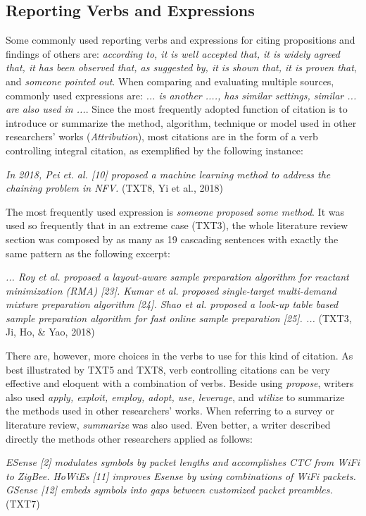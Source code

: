 
\subsection{Reporting Verbs and Expressions}
Some commonly used reporting verbs and expressions for citing propositions and findings of others are: \textit{according to, it is well accepted that, it is widely agreed that, it has been observed that, as suggested by, it is shown that, it is proven that}, and \textit{someone pointed out}. When comparing and evaluating multiple sources, commonly used expressions are: \textit{... is another ...., has similar settings, similar ... are also used in ...}. Since the most frequently adopted function of citation is to introduce or summarize the method, algorithm, technique or model used in other researchers’ works (\textit{Attribution}), most citations are in the form of a verb controlling integral citation, as exemplified by the following instance:

\textit{In 2018, Pei et. al. [10] proposed a machine learning method to address the chaining problem in NFV.} (TXT8, Yi et al., 2018)

The most frequently used expression is \textit{someone proposed some method}. It was used so frequently that in an extreme case (TXT3), the whole literature review section was composed by as many as 19 cascading sentences with exactly the same pattern as the following excerpt:

\textit{... Roy et al. proposed a layout-aware sample preparation algorithm for reactant minimization (RMA) [23]. Kumar et al. proposed single-target multi-demand mixture preparation algorithm [24]. Shao et al. proposed a look-up table based sample preparation algorithm for fast online sample preparation [25]. ...} (TXT3, Ji, Ho, \& Yao, 2018)

There are, however, more choices in the verbs to use for this kind of citation. As best illustrated by TXT5 and TXT8, verb controlling citations can be very effective and eloquent with a combination of verbs. Beside using \textit{propose}, writers also used \textit{apply, exploit, employ, adopt, use, leverage}, and \textit{utilize} to summarize the methods used in other researchers’ works. When referring to a survey or literature review, \textit{summarize} was also used. Even better, a writer described directly the methods other researchers applied as follows:

\textit{ESense [2] modulates symbols by packet lengths and accomplishes CTC from WiFi to ZigBee. HoWiEs [11] improves Esense by using combinations of WiFi packets. GSense [12] embeds symbols into gaps between customized packet preambles.} (TXT7)

